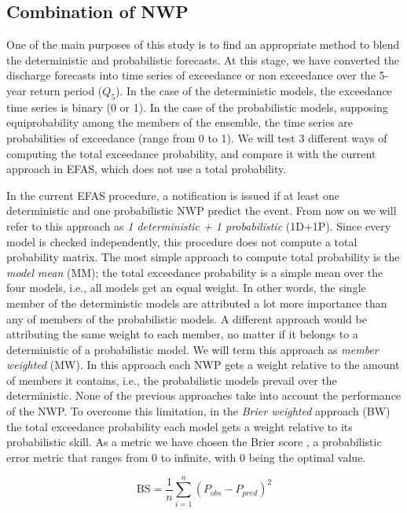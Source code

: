\documentclass[preprint,12pt]{elsarticle}
\begin{document}
\subsection{Combination of NWP}
\label{sec:methods_COMB}

One of the main purposes of this study is to find an appropriate method to blend the deterministic and probabilistic forecasts. At this stage, we have converted the discharge forecasts into time series of exceedance or non exceedance over the 5-year return period ($Q_5$). In the case of the deterministic models, the exceedance time series is binary (0 or 1). In the case of the probabilistic models, supposing equiprobability among the members of the ensemble, the time series are probabilities of exceedance (range from 0 to 1). We will test 3 different ways of computing the total exceedance probability, and compare it with the current approach in EFAS, which does not use a total probability.

In the current EFAS procedure, a notification is issued if at least one deterministic and one probabilistic NWP predict the event. From now on we will refer to this approach as \textit{1 deterministic + 1 probabilistic} (1D+1P). Since every model is checked independently, this procedure does not compute a total probability matrix. The most simple approach to compute total probability is the \textit{model mean} (MM); the total exceedance probability is a simple mean over the four models, i.e., all models get an equal weight. In other words, the single member of the deterministic models are attributed a lot more importance than any of members of the probabilistic models. A different approach would be attributing the same weight to each member,  no matter if it belongs to a deterministic of a probabilistic model. We will term this approach as \textit{member weighted} (MW). In this approach each NWP gets a weight relative to the amount of members it contains, i.e., the probabilistic models prevail over the deterministic. None of the previous approaches take into account the performance of the NWP. To overcome this limitation, in the \textit{Brier weighted} approach (BW) the total exceedance probability each model gets a weight relative to its probabilistic skill. As a metric we have chosen the Brier score \cite{Brier1950}, a probabilistic error metric that ranges from 0 to infinite, with 0 being the optimal value. 

\begin{equation}
    \label{eq:BS}
    \text{BS} = \frac{1}{n}\sum_{i=1}^{n} \left( P_{obs} - P_{pred} \right)^2
\end{equation}
\end{document}
